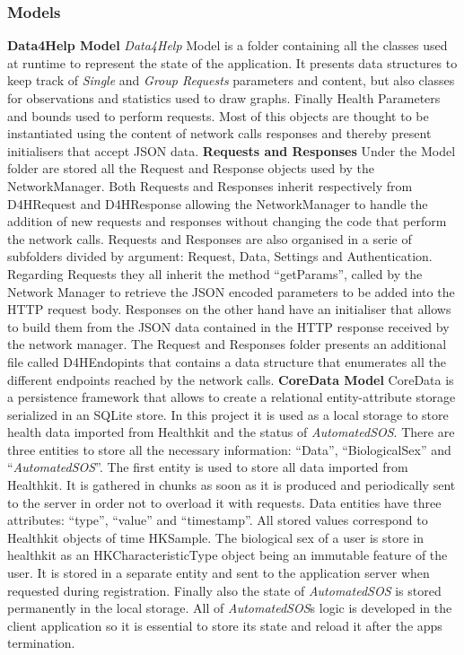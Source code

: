 \documentclass[titlepage]{article}
\begin{document}
	
	\subsubsection{Models}
	{\bf Data4Help Model} \newline
	{\it Data4Help} Model is a folder containing all the classes used at runtime to represent the state of the application. It presents data structures to keep track of {\it Single} and {\it Group Requests} parameters and content, but also classes for observations and statistics used to draw graphs. Finally Health Parameters and bounds used to perform requests. Most of this objects are thought to be instantiated using the content of network calls responses and thereby present initialisers that accept JSON data.\newline \newline
	\noindent
	{\bf Requests and Responses}\newline
	Under the Model folder are stored all the Request and Response objects used by the NetworkManager. Both Requests and Responses inherit respectively from D4HRequest and D4HResponse allowing the NetworkManager to handle the addition of new requests and responses without changing the code that perform the network calls. Requests and Responses are also organised in a serie of subfolders divided by argument: Request, Data, Settings and Authentication. Regarding Requests they all inherit the method “getParams”, called by the Network Manager to retrieve the JSON encoded parameters to be added into the HTTP request body. Responses on the other hand have an initialiser that allows to build them from the JSON data contained in the HTTP response received by the network manager. The Request and Responses folder presents an additional file called D4HEndopints that contains a data structure that enumerates all the different endpoints reached by the network calls.\newline
	\newline
	\noindent
	{\bf CoreData Model} \newline
	CoreData is a persistence framework that allows to create a relational entity-attribute storage serialized in an SQLite store. In this project it is used as a local storage to store health data imported from Healthkit and the status of {\it AutomatedSOS}. There are three entities to store all the necessary information: “Data”, “BiologicalSex” and “{\it AutomatedSOS}”.
	The first entity is used to store all data imported from Healthkit. It is gathered in chunks as soon as it is produced and periodically sent to the server in order not to overload it with requests. Data entities have three attributes: “type”, “value” and “timestamp”. All stored values correspond to Healthkit objects of time HKSample. The biological sex of a user is store in healthkit as an HKCharacteristicType object being an immutable feature of the user. It is stored in a separate entity and sent to the application server when requested during registration. Finally also the state of {\it AutomatedSOS} is stored permanently in the local storage. All of {\it AutomatedSOS}\textsc{}s logic is developed in the client application so it is essential to store its state and reload it after the app\textsc{}s termination. \newline
\end{document}
